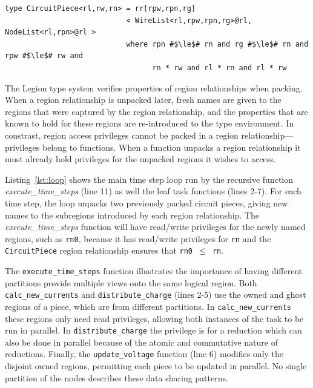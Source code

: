 \begin{lstlisting}[label={lst:rr},caption={Region Relationship Example}]
type CircuitPiece<rl,rw,rn> = rr[rpw,rpn,rg]
                            < WireList<rl,rpw,rpn,rg>@rl, NodeList<rl,rpn>@rl >         
                            where rpn #$\le$# rn and rg #$\le$# rn and rpw #$\le$# rw and
                                  rn * rw and rl * rn and rl * rw
\end{lstlisting}

The Legion type system verifies properties of region relationships when packing.  When
a region relationship is unpacked later, fresh names are given to the regions that were
captured by the region relationship, and the properties that are known to hold for these
regions are re-introduced to the type environment.
In constrast, region access privileges cannot be packed in a region
relationship---privileges belong to functions. When a function unpacks
a region relationship it must already hold privileges for the unpacked regions it wishes to access.

Listing~\ref{lst:loop} shows the main time step loop run by the 
recursive function {\em execute\_time\_steps} (line 11)
as well the leaf task functions (lines 2-7).  
For each time step, the loop unpacks 
two previously packed circuit pieces, giving new names to the subregions introduced
by each region relationship.  The {\em execute\_time\_steps} function
will have read/write privileges for the newly named regions, such as {\tt rn0},
because it has read/write privileges for {\tt rn} and the {\tt CircuitPiece} 
region relationship ensures that {\tt rn0 $\leq$ rn}.

The {\tt execute\_time\_steps} function   
illustrates the importance of having different partitions provide 
multiple views onto the same logical region.  Both {\tt calc\_new\_currents} 
and {\tt distribute\_charge} (lines 2-5)
use the owned and ghost regions of a piece, which are from different partitions. In
{\tt calc\_new\_currents} these regions only need read
privileges, allowing both instances of the task to be
run in parallel.  In {\tt distribute\_charge} the
privilege is for a reduction which can also be done in parallel
because of the atomic and commutative nature of reductions.  Finally,
the {\tt update\_voltage} function (line 6) modifies only the disjoint owned regions, 
permitting each piece to be updated in parallel.  No single partition of the nodes
describes these data sharing patterns.

